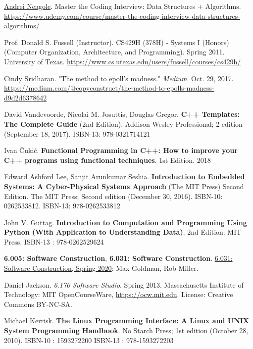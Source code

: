\documentclass[10pt]{amsart}
\begin{document}
\begin{thebibliography}{9}
\href{https://www.udemy.com/course/master-the-coding-interview-data-structures-algorithms/#instructor-1}{Andrei Neagole}. Master the Coding Interview: Data Structures $+$ Algorithms. 
\url{https://www.udemy.com/course/master-the-coding-interview-data-structures-algorithms/}

Prof. Donald S. Fussell (Instructor). CS429H (378H) - Systems I (Honors) (Computer Organization, Architecture, and Programming). Spring 2011. University of Texas. \url{https://www.cs.utexas.edu/users/fussell/courses/cs429h/}

 Cindy Sridharan. "The method to epoll's madness." \emph{Medium}. Oct. 29, 2017. \url{https://medium.com/@copyconstruct/the-method-to-epolls-madness-d9d2d6378642}

David Vandevoorde, Nicolai M. Josuttis, Douglas Gregor. \textbf{C++ Templates: The Complete Guide} (2nd Edition). Addison-Wesley Professional; 2 edition (September 18, 2017). ISBN-13: 978-0321714121

Ivan \v{C}uki\'{c}. \textbf{Functional Programming in C++: How to improve your C++ programs using functional techniques}. 1st Edition. 2018

Edward Ashford Lee, Sanjit Arunkumar Seshia. \textbf{Introduction to Embedded Systems: A Cyber-Physical Systems Approach} (The MIT Press) Second Edition. The MIT Press; Second edition (December 30, 2016). ISBN-10: 0262533812. ISBN-13: 978-0262533812

John V. Guttag. \textbf{Introduction to Computation and Programming Using Python (With Application to Understanding Data)}. 2nd Edition. 	MIT Press.  ISBN-13 : 978-0262529624 

\textbf{6.005: Software Construction}, \textbf{6.031: Software Construction}. \href{http://web.mit.edu/6.031/www/sp20/}{6.031: Software Construction, Spring 2020}: Max Goldman, Rob Miller.


Daniel Jackson. \emph{6.170 Software Studio}. Spring 2013. Massachusetts Institute of Technology: MIT OpenCourseWare, \url{https://ocw.mit.edu}. License: Creative Commons BY-NC-SA.\cite{Jack2013}

Michael Kerrisk. \textbf{The Linux Programming Interface: A Linux and UNIX System Programming Handbook}. No Starch Press; 1st edition (October 28, 2010). ISBN-10 : 1593272200 ISBN-13 : 978-1593272203 

\end{thebibliography}
\end{document}
